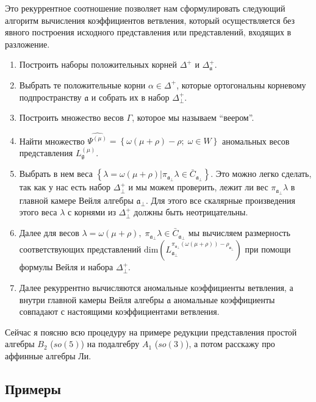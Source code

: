 Это рекуррентное соотношение позволяет нам сформулировать следующий алгоритм вычисления
коэффициентов ветвления, который осуществляется без явного построения исходного представления или
представлений, входящих в разложение.
\begin{enumerate}
\item Построить наборы положительных корней $\Delta^{+}$ и $\Delta_{\mathfrak{a}}^{+}$.
\item Выбрать те положительные корни $\alpha\in \Delta^{+}$, которые ортогональны корневому
  подпространству  $\mathfrak{a}$ и собрать их в набор $\Delta^{+}_{\bot}$.
\item Построить множество весов $\Gamma$, которое мы называем ``веером''.
\item Найти множество $\widehat{\Psi^{(\mu)}}=\left\{\omega(\mu+\rho)-\rho;\; \omega\in W\right\}$
  аномальных весов представления $L^{(\mu)}_{\mathfrak{g}}$.
\item Выбрать в нем веса $\left\{ \lambda=\omega(\mu+\rho) | \pi_{\mathfrak{a}_{\bot}}\lambda \in
    \bar{C}_{\mathfrak{a}_{\bot}} \right\}$. Это можно легко сделать, так как у нас есть набор
  $\Delta^{+}_{\bot}$ и мы можем проверить, лежит ли вес $\pi_{\mathfrak{a}_{\bot}}\lambda$ в
  главной камере Вейля алгебры $\mathfrak{a}_{\bot}$. Для этого все скалярные произведения этого
  веса $\lambda$ с корнями из  $\Delta^{+}_{\bot}$ должны быть неотрицательны.
\item Далее для весов $\lambda=\omega(\mu+\rho),\; \pi_{\mathfrak{a}_{\bot}}\lambda\in
  \bar{C}_{\mathfrak{a}_{\bot}}$ мы вычисляем размерность соответствующих представлений
  $\mathrm{dim}\left(L^{\pi_{\mathfrak{a}_{\bot}}(\omega(\mu+\rho))-\rho_{\mathfrak{a}_{\bot}}}_{\mathfrak{a}_{\bot}}\right)$
  при помощи формулы Вейля и набора $\Delta^{+}_{\bot}$.
\item Далее рекуррентно вычисляются аномальные коэффициенты ветвления, а внутри главной камеры Вейля
  алгебры $\mathfrak{a}$ аномальные коэффициенты совпадают с настоящими коэффициентами ветвления.
\end{enumerate}

Сейчас я поясню всю процедуру на примере редукции представления простой алгебры $B_2$ ($so(5)$) на
подалгебру $A_1$ ($so(3)$), а потом расскажу про аффинные алгебры Ли.

\subsection{Примеры}
\label{sec:examples}

